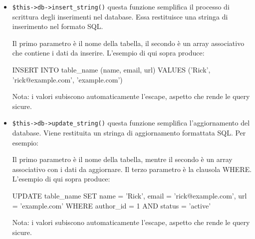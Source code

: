 \begin{itemize}
\item \verb|$this->db->insert_string()| questa funzione semplifica il processo di scrittura degli inserimenti nel database. Essa restituisce una stringa di inserimento nel formato SQL.


Il primo parametro è il nome della tabella, il secondo è un array associativo che contiene i dati da inserire. L'esempio di qui sopra produce:

\begin{code}
INSERT INTO table_name (name, email, url) VALUES ('Rick', 'rick@example.com', 'example.com')
\end{code}

Nota: i valori subiscono automaticamente l'escape, aspetto che rende le query sicure.

\item \verb|$this->db->update_string()| questa funzione semplifica l'aggiornamento del database. Viene restituita un stringa di aggiornamento formattata SQL. Per esempio:


Il primo parametro è il nome della tabella, mentre il secondo è un array associativo con i dati da aggiornare. Il terzo parametro è la clausola WHERE. L'esempio di qui sopra produce:

\begin{code}
UPDATE table_name SET name = 'Rick', email = 'rick@example.com', url = 'example.com' WHERE author_id = 1 AND status = 'active'
\end{code}

Nota: i valori subiscono automaticamente l'escape, aspetto che rende le query sicure.
\end{itemize}
